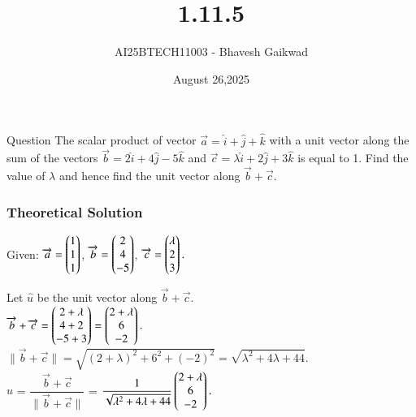 \documentclass{beamer}
\title
{1.11.5}
\date{August 26,2025}
\author 
{AI25BTECH11003 - Bhavesh Gaikwad}
\begin{document}
\frame{\titlepage}
\begin{frame}{Question}
The scalar product of vector $\overrightarrow{a} = \hat{i} + \hat{j} + \hat{k}$ with a unit vector along the sum of the vectors $\overrightarrow{b} =2\hat{i} + 4\hat{j} - 5\hat{k} $ and $\overrightarrow{c} = \lambda\hat{i} + 2\hat{j} + 3\hat{k}$ is equal to 1. Find the value of $\lambda$ and hence find the unit vector along $\overrightarrow{b} + \overrightarrow{c}$.
\end{frame}


\begin{frame}[fragile]
    \frametitle{Theoretical Solution}

 Given: $\overrightarrow{a}=\begin{pmatrix}1\\1\\1\end{pmatrix}$,  $\overrightarrow{b}=\begin{pmatrix}2\\4\\-5\end{pmatrix}$,  $\overrightarrow{c}=\begin{pmatrix}\lambda\\2\\3\end{pmatrix}.$

Let $\hat{u}$ be the unit vector along $\overrightarrow{b} + \overrightarrow{c} .$ \\

$ \overrightarrow{b} + \overrightarrow{c} = \begin{pmatrix}2+\lambda\\4+2\\-5+3\end{pmatrix}
=\begin{pmatrix}2+\lambda\\6\\-2\end{pmatrix}.$ \\

$\|\overrightarrow{b}+\overrightarrow{c}\| = \sqrt{(2+\lambda)^2+6^2+(-2)^2}
 = \sqrt{\lambda^2+4\lambda+44}.$ \\

$\hat{u}$ = $\dfrac{\overrightarrow{b} + \overrightarrow{c}}{\|\overrightarrow{b}+\overrightarrow{c}\|}$ = $\dfrac{1}{\sqrt{\lambda^2+4\lambda+44}} \begin{pmatrix}2+\lambda\\6\\-2\end{pmatrix}.$ \\\\


\end{frame}
\end{document}
